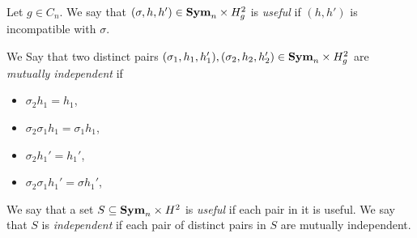 \documentclass[../paper.tex]{subfiles}
\begin{document}




\begin{definition}
  Let $g \in C_n$. We say that $(\sigma, h, h') \in \text{\textbf{Sym}}_n \times H^2_g$ is
  \emph{useful} if $(h,h')$ is incompatible with $\sigma$.

  We Say that two distinct pairs $(\sigma_1, h_1, h_1'), (\sigma_2, h_2, h_2')
  \in \text{\textbf{Sym}}_n\times H^2_g$ are \emph{mutually independent} if
  \begin{itemize}
    \setlength\itemsep{0mm}
  \item $\sigma_2 h_1 = h_1$,
  \item $\sigma_2 \sigma_1 h_1 = \sigma_1 h_1$,
  \item $\sigma_2 h_1' = h_1'$,
  \item $\sigma_2 \sigma_1 h_1' = \sigma h_1'$,
  \end{itemize}
  
  We say that a set $S \subseteq \text{\textbf{Sym}}_n \times H^2$ is \emph{useful} if each
  pair in it is useful. We say that $S$ is \emph{independent} if each pair of
  distinct pairs in $S$ are mutually independent.
\end{definition}
\end{document}
